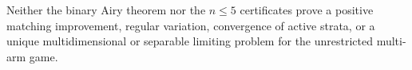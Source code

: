 Neither the binary Airy theorem nor the \(n\leq5\) certificates prove a positive matching improvement, regular variation, convergence of active strata, or a unique multidimensional or separable limiting problem for the unrestricted multi-arm game.